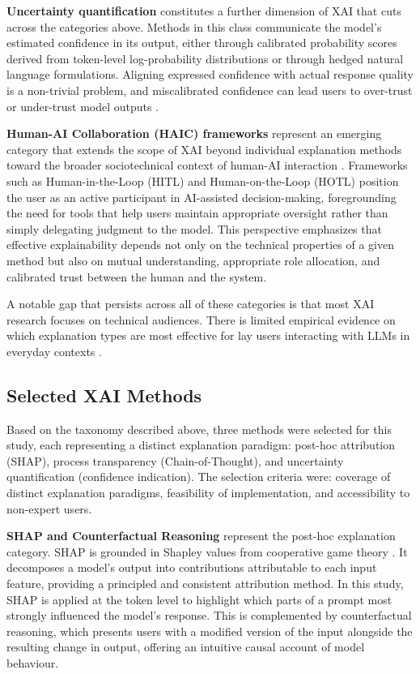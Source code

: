\textbf{Uncertainty quantification} constitutes a further dimension of XAI that cuts across the categories above. Methods in this class communicate the model's estimated confidence in its output, either through calibrated probability scores derived from token-level log-probability distributions or through hedged natural language formulations. Aligning expressed confidence with actual response quality is a non-trivial problem, and miscalibrated confidence can lead users to over-trust or under-trust model outputs \cite{tao_when_2024}.

\textbf{Human-AI Collaboration (HAIC) frameworks} represent an emerging category that extends the scope of XAI beyond individual explanation methods toward the broader sociotechnical context of human-AI interaction \cite{jeong_design_2025}. Frameworks such as Human-in-the-Loop (HITL) and Human-on-the-Loop (HOTL) position the user as an active participant in AI-assisted decision-making, foregrounding the need for tools that help users maintain appropriate oversight rather than simply delegating judgment to the model. This perspective emphasizes that effective explainability depends not only on the technical properties of a given method but also on mutual understanding, appropriate role allocation, and calibrated trust between the human and the system.

A notable gap that persists across all of these categories is that most XAI research focuses on technical audiences. There is limited empirical evidence on which explanation types are most effective for lay users interacting with LLMs in everyday contexts \cite{wu_usable_2025}.

\subsection{Selected XAI Methods}
\label{sec:selected_xai_methods}

Based on the taxonomy described above, three methods were selected for this study, each representing a distinct explanation paradigm: post-hoc attribution (SHAP), process transparency (Chain-of-Thought), and uncertainty quantification (confidence indication). The selection criteria were: coverage of distinct explanation paradigms, feasibility of implementation, and accessibility to non-expert users.

\textbf{SHAP and Counterfactual Reasoning} represent the post-hoc explanation category. SHAP is grounded in Shapley values from cooperative game theory \cite{lundberg_unified_2017}. It decomposes a model's output into contributions attributable to each input feature, providing a principled and consistent attribution method. In this study, SHAP is applied at the token level to highlight which parts of a prompt most strongly influenced the model's response. This is complemented by counterfactual reasoning, which presents users with a modified version of the input alongside the resulting change in output, offering an intuitive causal account of model behaviour.

